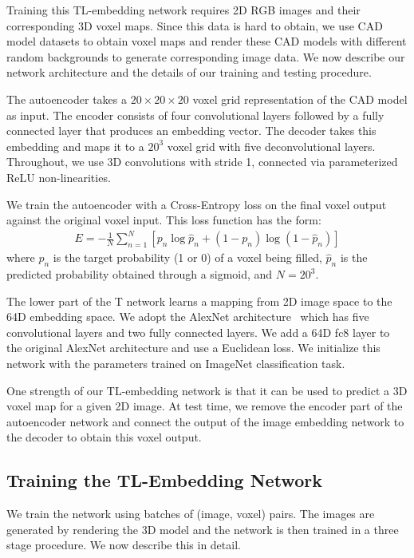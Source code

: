 \documentclass[runningheads]{llncs}
\begin{document}
Training this TL-embedding network requires 2D RGB images and their corresponding 3D voxel maps.
Since this data is hard to obtain, we use CAD model datasets to obtain voxel
maps and render these CAD models with different random backgrounds to generate
corresponding image data. We now describe our network architecture and the
details of our training and testing procedure.

The autoencoder takes a $20\times20\times20$%
voxel grid representation
of the CAD model as input. The encoder consists of four convolutional layers
followed by a fully connected layer that produces an embedding vector.
The decoder takes this embedding and maps it to a 
$20^3$ voxel grid with five deconvolutional layers. Throughout, we
use 3D convolutions with stride 1, connected via parameterized
ReLU \cite{he2015delving} non-linearities.

We train the autoencoder with a Cross-Entropy loss on the
final voxel output against the original voxel input. This loss function has
the form:
\begin{eqnarray}\label{eq:loss}
E = -\frac{1}{N} \sum_{n=1}^{N} [p_n \log \hat{p}_n + (1 - p_n) \log(1 - \hat{p}_n)]
\end{eqnarray}
where $p_n$ is the target
probability (1 or 0) of a voxel being filled, $\hat{p}_n$ is the predicted probability obtained through
a sigmoid, and $N = 20^3$.

The lower part of the T
network learns a mapping from 2D image space to the 64D embedding
space. We adopt the AlexNet architecture~\cite{AlexNet} which has five
convolutional layers and two fully connected layers. We add
a 64D fc8 layer to the original AlexNet architecture and use a
Euclidean loss. We initialize this network with the parameters
trained on ImageNet \cite{deng2009imagenet} classification task.

One strength of our TL-embedding network is that it can be used to
predict a 3D voxel map for a given 2D image. 
At test time, we remove
the encoder part of the autoencoder 
network and connect the output of the image
embedding network to the decoder to obtain this voxel output.

\subsection{Training the TL-Embedding Network}

We train the network using batches of (image, voxel) pairs. The images are
generated by rendering the 3D model and the network is then trained in a three
stage procedure. We now describe this in detail.
\end{document}
